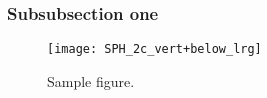\documentclass[12pt]{article}
\begin{document}
\subsubsection{Subsubsection one}\label{sec:subsimulation2-1}

\begin{figure}[H]
\centering
\texttt{[image: SPH\_2c\_vert+below\_lrg]}
\label{fig: sample}
\caption{Sample figure.}
\end{figure}
















\end{document}
